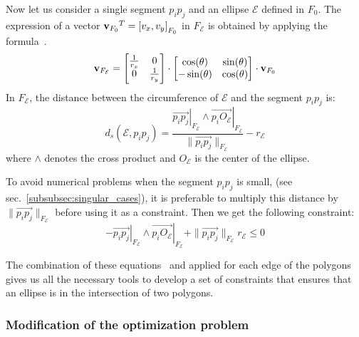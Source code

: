 Now let us consider a single segment $p_i p_j$ and an ellipse $\mathcal{E}$ defined in $F_0$.
The expression of a vector ${{\bf v}_{F_0}}^T = {[v_x, v_y]}_{F_0}$ in $F_\mathcal{E}$ is obtained by applying the formula~.
\begin{equation}
{\bf v}_{F_\mathcal{E}} =
\begin{bmatrix}
\frac{1}{r_x} & 0 \\
0 & \frac{1}{r_y}
\end{bmatrix}
\cdot \begin{bmatrix}
\cos(\theta) & \sin(\theta) \\
-\sin(\theta) & \cos(\theta)
\end{bmatrix}
\cdot {\bf v}_{F_0}
\label{eq:F0-to-FE}
\end{equation}
In $F_\mathcal{E}$, the distance between the circumference of $\mathcal{E}$ and the segment $p_i p_j$ is:
\begin{equation}
  d_s(\mathcal{E}, p_i p_j) = \frac{{\left.\overrightarrow{p_i p_j}\right|}_{F_\mathcal{E}} \wedge {\left.\overrightarrow{p_i O_\mathcal{E}}\right|}_{F_\mathcal{E} } }{\| \overrightarrow{p_i p_j}\|_{F_\mathcal{E} } }-r_{\mathcal{E}}
\end{equation}
where $\wedge$ denotes the cross product and $O_{\mathcal{E}}$ is the center of the ellipse.

To avoid numerical problems when the segment $p_i p_j$ is small, (see sec.~\ref{subsubsec:singular_cases}), it is preferable to multiply this distance by $\| \overrightarrow{p_i p_j}\|_{F_\mathcal{E}}$ before using it as a constraint.
Then we get the following constraint:
\begin{equation}
  -{\left.\overrightarrow{p_i p_j}\right|}_{F_\mathcal{E}} \wedge {\left.\overrightarrow{p_i O_\mathcal{E}}\right|}_{F_\mathcal{E}}+\| \overrightarrow{p_i p_j}\|_{F_\mathcal{E}} r_{\mathcal{E}} \leq 0
\label{eq:pseudo-distance}
\end{equation}

The combination of these equations~ and  applied for each edge of the polygons gives us all the necessary tools to develop a set of constraints that ensures that an ellipse is in the intersection of two polygons.



\subsubsection{Modification of the optimization problem}

